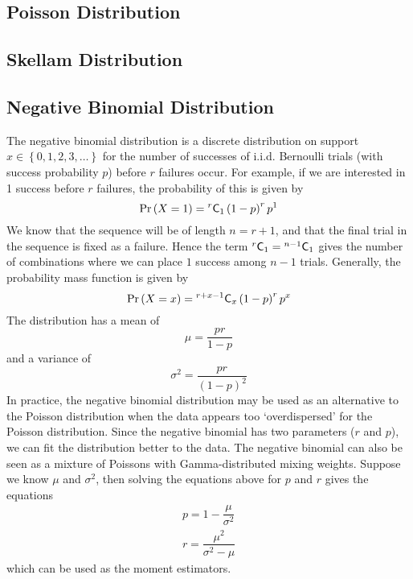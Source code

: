 \documentclass[11pt]{report} %
\begin{document}
\subsection{Poisson Distribution}

\subsection{Skellam Distribution}

\subsection{Negative Binomial Distribution}

The negative binomial distribution is a discrete distribution on support $x \in \left\{0, 1, 2, 3, \dots\right\}$ for the number of successes of i.i.d. Bernoulli trials (with success probability $p$) before $r$ failures occur. For example, if we are interested in 1 success before $r$ failures, the probability of this is given by
\begin{equation}
\operatorname{Pr}\left(X = 1\right) = \mathstrut^{r}\mathsf{C}_{1}\left(1 - p\right)^{r}p^{1}
\end{equation}
We know that the sequence will be of length $n = r + 1$, and that the final trial in the sequence is fixed as a failure. Hence the term $\mathstrut^{r}\mathsf{C}_{1} = \mathstrut^{n - 1}\mathsf{C}_{1}$ gives the number of combinations where we can place $1$ success among $n - 1$ trials. Generally, the probability mass function is given by
\begin{equation}
\operatorname{Pr}\left(X = x\right) = \mathstrut^{r + x - 1}\mathsf{C}_{x}\left(1 - p\right)^{r}p^{x}
\end{equation}
The distribution has a mean of
\begin{equation}
\mu = \dfrac{pr}{1 - p}
\end{equation}
and a variance of
\begin{equation}
\sigma^{2} = \dfrac{pr}{\left(1 - p\right)^{2}}
\end{equation}
In practice, the negative binomial distribution may be used as an alternative to the Poisson distribution when the data appears too `overdispersed' for the Poisson distribution. Since the negative binomial has two parameters ($r$ and $p$), we can fit the distribution better to the data. The negative binomial can also be seen as a mixture of Poissons with Gamma-distributed mixing weights. Suppose we know $\mu$ and $\sigma^{2}$, then solving the equations above for $p$ and $r$ gives the equations
\begin{gather}
p = 1 - \dfrac{\mu}{\sigma^{2}} \\
r = \dfrac{\mu^{2}}{\sigma^{2} - \mu}
\end{gather}
which can be used as the moment estimators.
\end{document}
